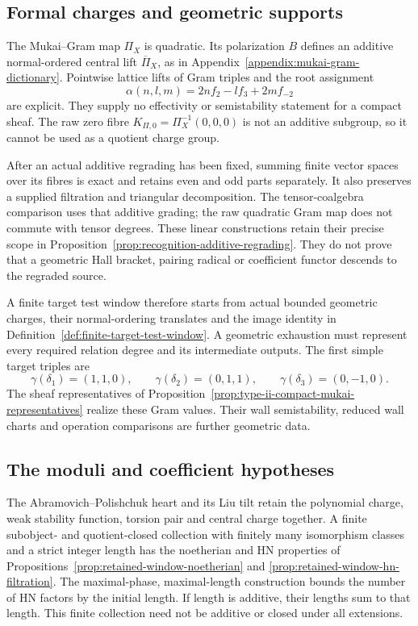 \subsection*{Formal charges and geometric supports}

The Mukai--Gram map \(\Pi_X\) is quadratic. Its polarization
\(B\) defines an additive normal-ordered central lift
\(\overline\Pi_X\), as in Appendix~\ref{appendix:mukai-gram-dictionary}.
Pointwise lattice lifts of Gram triples and the root assignment
\[
 \alpha(n,l,m)=2nf_2-lf_3+2mf_{-2}
\]
are explicit. They supply no effectivity or semistability statement
for a compact sheaf. The raw zero fibre
\(K_{\Pi,0}=\Pi_X^{-1}(0,0,0)\) is not an additive subgroup,
so it cannot be used as a quotient charge group.

After an actual additive regrading has been fixed, summing finite
vector spaces over its fibres is exact and retains even and odd
parts separately. It also preserves a supplied filtration and
triangular decomposition. The tensor-coalgebra comparison uses
that additive grading; the raw quadratic Gram map does not
commute with tensor degrees. These linear constructions retain
their precise scope in
Proposition~\ref{prop:recognition-additive-regrading}. They do
not prove that a geometric Hall bracket, pairing radical or
coefficient functor descends to the regraded source.

A finite target test window therefore starts from actual bounded
geometric charges, their normal-ordering translates and the image
identity in Definition~\ref{def:finite-target-test-window}.
A geometric exhaustion must represent every required relation
degree and its intermediate outputs. The first simple target
triples are
\[
 \gamma(\delta_1)=(1,1,0),\qquad
 \gamma(\delta_2)=(0,1,1),\qquad
 \gamma(\delta_3)=(0,-1,0).
\]
The sheaf representatives of
Proposition~\ref{prop:type-ii-compact-mukai-representatives}
realize these Gram values. Their wall semistability, reduced wall
charts and operation comparisons are further geometric data.

\subsection*{The moduli and coefficient hypotheses}

The Abramovich--Polishchuk heart and its Liu tilt retain the
polynomial charge, weak stability function, torsion pair and
central charge together. A finite subobject- and quotient-closed
collection with finitely many isomorphism classes and a strict
integer length has the noetherian and HN properties of
Propositions~\ref{prop:retained-window-noetherian} and
\ref{prop:retained-window-hn-filtration}. The maximal-phase,
maximal-length construction bounds the number of HN factors by
the initial length. If length is additive, their lengths sum to
that length. This finite collection need not be additive or
closed under all extensions.

